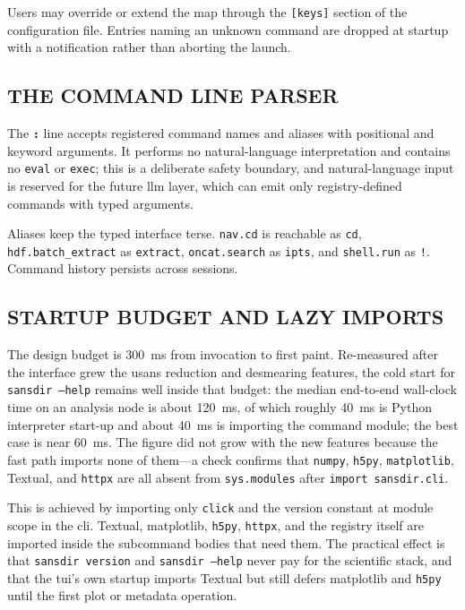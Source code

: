 \documentclass[tm]{ornltm}
\newcommand{\cmd}[1]{\texttt{#1}}
\newcommand{\key}[1]{\textbf{\texttt{#1}}}
\begin{document}
Users may override or extend the map through the \texttt{[keys]} section of the
configuration file. Entries naming an unknown command are dropped at startup with
a notification rather than aborting the launch.

\subsection{THE COMMAND LINE PARSER}

The \key{:} line accepts registered command names and aliases with positional and
keyword arguments. It performs no natural-language interpretation and contains no
\texttt{eval} or \texttt{exec}; this is a deliberate safety boundary, and
natural-language input is reserved for the future \ac{llm} layer, which can emit
only registry-defined commands with typed arguments.

Aliases keep the typed interface terse. \cmd{nav.cd} is reachable as
\texttt{cd}, \cmd{hdf.batch\_extract} as \texttt{extract},
\cmd{oncat.search} as \texttt{ipts}, and \cmd{shell.run} as \texttt{!}.
Command history persists across sessions.

\subsection{STARTUP BUDGET AND LAZY IMPORTS}
\label{sec:startup}

The design budget is 300~ms from invocation to first paint. Re-measured after
the interface grew the \ac{usans} reduction and desmearing features, the cold
start for \texttt{sansdir --help} remains well inside that budget: the median
end-to-end wall-clock time on an analysis node is about 120~ms, of which roughly
40~ms is Python interpreter start-up and about 40~ms is importing the command
module; the best case is near 60~ms. The figure did not grow with the new
features because the fast path imports none of them---a check confirms that
\texttt{numpy}, \texttt{h5py}, \texttt{matplotlib}, Textual, and \texttt{httpx}
are all absent from \texttt{sys.modules} after \texttt{import sansdir.cli}.

This is achieved by importing only \texttt{click} and the version constant at
module scope in the \ac{cli}. Textual, matplotlib, \texttt{h5py}, \texttt{httpx},
and the registry itself are imported inside the subcommand bodies that need them.
The practical effect is that \texttt{sansdir version} and \texttt{sansdir --help}
never pay for the scientific stack, and that the \ac{tui}'s own startup imports
Textual but still defers matplotlib and \texttt{h5py} until the first plot or
metadata operation.
\end{document}
